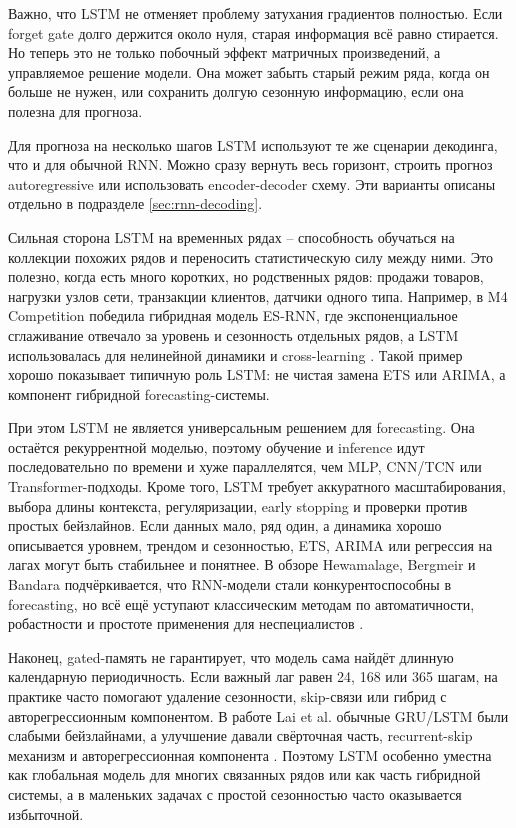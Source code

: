 \documentclass[12pt,fleqn]{article}
\begin{document}
Важно, что LSTM не отменяет проблему затухания градиентов полностью.
Если forget gate долго держится около нуля, старая информация всё равно стирается.
Но теперь это не только побочный эффект матричных произведений, а управляемое решение модели.
Она может забыть старый режим ряда, когда он больше не нужен, или сохранить долгую сезонную информацию, если она полезна для прогноза.

Для прогноза на несколько шагов LSTM используют те же сценарии декодинга, что и для обычной RNN.
Можно сразу вернуть весь горизонт, строить прогноз autoregressive или использовать encoder-decoder схему.
Эти варианты описаны отдельно в подразделе \ref{sec:rnn-decoding}.

Сильная сторона LSTM на временных рядах -- способность обучаться на коллекции похожих рядов и переносить статистическую силу между ними.
Это полезно, когда есть много коротких, но родственных рядов: продажи товаров, нагрузки узлов сети, транзакции клиентов, датчики одного типа.
Например, в M4 Competition победила гибридная модель ES-RNN, где экспоненциальное сглаживание отвечало за уровень и сезонность отдельных рядов, а LSTM использовалась для нелинейной динамики и cross-learning \cite{smyl2020}.
Такой пример хорошо показывает типичную роль LSTM: не чистая замена ETS или ARIMA, а компонент гибридной forecasting-системы.

При этом LSTM не является универсальным решением для forecasting.
Она остаётся рекуррентной моделью, поэтому обучение и inference идут последовательно по времени и хуже параллелятся, чем MLP, CNN/TCN или Transformer-подходы.
Кроме того, LSTM требует аккуратного масштабирования, выбора длины контекста, регуляризации, early stopping и проверки против простых бейзлайнов.
Если данных мало, ряд один, а динамика хорошо описывается уровнем, трендом и сезонностью, ETS, ARIMA или регрессия на лагах могут быть стабильнее и понятнее.
В обзоре Hewamalage, Bergmeir и Bandara подчёркивается, что RNN-модели стали конкурентоспособны в forecasting, но всё ещё уступают классическим методам по автоматичности, робастности и простоте применения для неспециалистов \cite{hewamalage2021}.

Наконец, gated-память не гарантирует, что модель сама найдёт длинную календарную периодичность.
Если важный лаг равен 24, 168 или 365 шагам, на практике часто помогают удаление сезонности, skip-связи или гибрид с авторегрессионным компонентом.
В работе Lai et al. обычные GRU/LSTM были слабыми бейзлайнами, а улучшение давали свёрточная часть, recurrent-skip механизм и авторегрессионная компонента \cite{lai2018}.
Поэтому LSTM особенно уместна как глобальная модель для многих связанных рядов или как часть гибридной системы, а в маленьких задачах с простой сезонностью часто оказывается избыточной.
\end{document}
